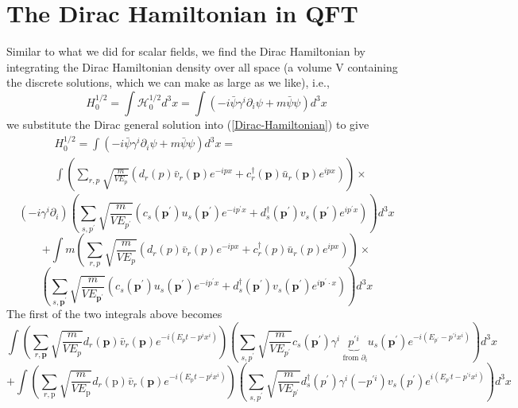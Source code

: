 \section{The Dirac Hamiltonian in QFT}
Similar to what we did for scalar fields, we find the Dirac Hamiltonian by integrating the Dirac Hamiltonian density over all space (a volume V containing the discrete solutions, which we can make as large as we like), i.e.,
\begin{equation}
H_{0}^{1 / 2}=\int \mathcal{H}_{0}^{1 / 2} d^{3} x=\int\left(-i \bar{\psi} \gamma^{i} \partial_{i} \psi+m \bar{\psi} \psi\right) d^{3} x
\label{Dirac-Hamiltonian}
\end{equation}
we substitute the Dirac general solution into (\ref{Dirac-Hamiltonian}) to give
$$
\begin{aligned}
&H_{0}^{1 / 2}=\int\left(-i \bar{\psi} \gamma^{i} \partial_{i} \psi+m \bar{\psi} \psi\right) d^{3} x=\\
&\int\left(\sum_{r, p} \sqrt{\frac{m}{V E_{p}}}\left(d_{r}(p) \bar{v}_{r}(\mathbf{p}) e^{-i p x}+c_{r}^{\dagger}(\mathbf{p}) \bar{u}_{r}(\mathbf{p}) e^{i p x}\right)\right) \times
\end{aligned}
$$
$$
\left(-i \gamma^{i} \partial_{i}\right)\left(\sum_{s, p^{\prime}} \sqrt{\frac{m}{V E_{p^{\prime}}}}\left(c_{s}\left(\mathbf{p}^{\prime}\right) u_{s}\left(\mathbf{p}^{\prime}\right) e^{-i p^{\prime} x}+d_{s}^{\dagger}\left(\mathbf{p}^{\prime}\right) v_{s}\left(\mathbf{p}^{\prime}\right) e^{i p^{\prime} x}\right)\right) d^{3} x
$$
$$
+\int m\left(\sum_{r, p} \sqrt{\frac{m}{V E_{p}}}\left(d_{r}(p) \bar{v}_{r}(p) e^{-i p x}+c_{r}^{\dagger}(p) \bar{u}_{r}(p) e^{i p x}\right)\right) \times
$$
$$
\left(\sum_{s, \mathbf{p}^{\prime}} \sqrt{\frac{m}{V E_{\mathbf{p}^{\prime}}}}\left(c_{s}\left(\mathbf{p}^{\prime}\right) u_{s}\left(\mathbf{p}^{\prime}\right) e^{-i p^{\prime} x}+d_{s}^{\dagger}\left(\mathbf{p}^{\prime}\right) v_{s}\left(\mathbf{p}^{\prime}\right) e^{i \mathbf{p}^{\prime} \cdot x}\right)\right) d^{3} x
$$
The first of the two integrals above becomes
$$
 \int\left(\sum_{r, \mathbf{p}} \sqrt{\frac{m}{V E_{p}}}d_{r}(\mathbf{p}) \bar{v}_{r}(\mathbf{p}) e^{-i\left(E_{p} t-p^{i} x^{i}\right)}\right)\left(\sum_{s, p^{\prime}} \sqrt{\frac{m}{V E_{p^{\prime}}}} c_{s}\left(\mathbf{p}^{\prime}\right) \gamma^{i} \underbrace{p^{\prime i}}_{\text { from }\partial_i} u_{s}\left(\mathbf{p}^{\prime}\right) e^{-i\left(E_{p^{\prime}}-p^{\prime i} x^{i}\right)}\right)d^3x
$$
$$
+\int\left(\sum_{r, \mathrm{p}} \sqrt{\frac{m}{V E_{\mathrm{p}}}} d_{r}(\mathrm{p}) \bar{v}_{r}(\mathbf{p}) e^{-i\left(E_{\mathrm{p}} t-p^{i} x^{i}\right)}\right)\left(\sum_{s, p^{\prime}} \sqrt{\frac{m}{V E_{p^{\prime}}}} d_{s}^{\dagger}\left(p^{\prime}\right) \gamma^{i}\left(-p^{\prime i}\right) v_{s}\left(p^{\prime}\right) e^{i\left(E_{p^{\prime}}t-p^{\prime i} x^{i}\right)}\right) d^{3} x
$$
